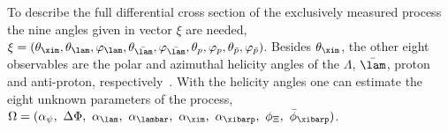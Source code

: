 \noindent To describe the full differential cross section of the exclusively measured process the nine angles given in vector $\xi$ are needed, $\xi= ( \theta_{\xim}, \theta_{\lam}, \varphi_{\lam}, \theta_{\bar{\lam}}, \varphi_{\bar{\lam}}, \theta_{p}, \varphi_{p}, \theta_{\bar{p}}, \varphi_{\bar{p}})$. Besides $\theta_{\xim}$, the other eight observables are the polar and azimuthal helicity angles of the $\Lambda$, $\bar{\lam}$, proton and anti-proton, respectively~\cite{MA10, BAM_licui}. With the helicity angles one can estimate the eight unknown parameters of the process, $\Omega = (\alpha_{\psi}, \ \Delta\Phi, \ \alpha_{\lam}, \ \alpha_{\lambar}, \ \alpha_{\xim}, \ \alpha_{\xibarp}, \ \phi_{\Xi}, \ \bar{\phi}_{\xibarp})$. 


 
